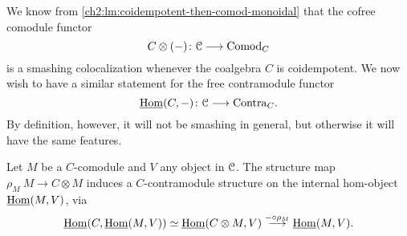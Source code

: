 


We know from \cref{ch2:lm:coidempotent-then-comod-monoidal} that the cofree comodule functor 
\[C\otimes(-)\colon \EuScript{C}\longrightarrow \mathrm{Comod}_C\]
is a smashing colocalization whenever the coalgebra $C$ is coidempotent. We now wish to have a similar statement for the free contramodule functor 
\[\operatorname{\underline{Hom}}(C,-)\colon \EuScript{C}\longrightarrow \mathrm{Contra}_C.\]
By definition, however, it will not be smashing in general, but otherwise it will have the same features. 

\begin{remark}
    \label{ch2:rm:contramodule-structure-on-hom-from-comodule}
    Let $M$ be a $C$-comodule and $V$ any object in $\EuScript{C}$. The structure map $\rho_M\: M\to C\otimes M$ induces a $C$-contramodule structure on the internal hom-object $\operatorname{\underline{Hom}}(M, V)$, via 
    \[\operatorname{\underline{Hom}}(C, \operatorname{\underline{Hom}}(M, V))\simeq \operatorname{\underline{Hom}}(C\otimes M, V)\overset{-\circ \rho_M}{\longrightarrow} \operatorname{\underline{Hom}}(M, V).\]
\end{remark}

